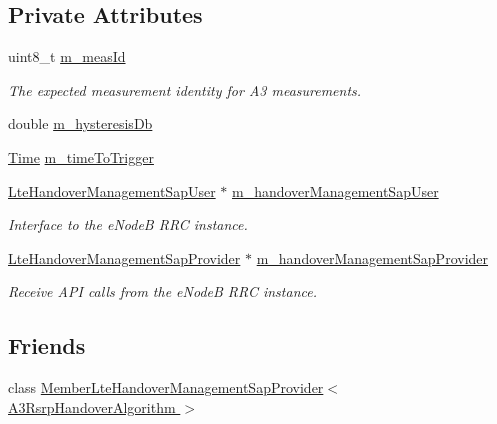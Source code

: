 \subsection*{Private Attributes}
\begin{DoxyCompactItemize}
\item 
uint8\+\_\+t \hyperlink{classns3_1_1A3RsrpHandoverAlgorithm_a96ba4646b316fc823618934a7a6d4aa1}{m\+\_\+meas\+Id}
\begin{DoxyCompactList}\small\item\em The expected measurement identity for A3 measurements. \end{DoxyCompactList}\item 
double \hyperlink{classns3_1_1A3RsrpHandoverAlgorithm_a2554a9c093c29f93f40efd6778d12a75}{m\+\_\+hysteresis\+Db}
\item 
\hyperlink{classns3_1_1Time}{Time} \hyperlink{classns3_1_1A3RsrpHandoverAlgorithm_a5158741f07ce566b8efc01f5e798ae78}{m\+\_\+time\+To\+Trigger}
\item 
\hyperlink{classns3_1_1LteHandoverManagementSapUser}{Lte\+Handover\+Management\+Sap\+User} $\ast$ \hyperlink{classns3_1_1A3RsrpHandoverAlgorithm_a2b06a54ee8a69e6943a4bd79bfe8da58}{m\+\_\+handover\+Management\+Sap\+User}
\begin{DoxyCompactList}\small\item\em Interface to the e\+NodeB R\+RC instance. \end{DoxyCompactList}\item 
\hyperlink{classns3_1_1LteHandoverManagementSapProvider}{Lte\+Handover\+Management\+Sap\+Provider} $\ast$ \hyperlink{classns3_1_1A3RsrpHandoverAlgorithm_a36db40273292062cc3e96236c32cbb2a}{m\+\_\+handover\+Management\+Sap\+Provider}
\begin{DoxyCompactList}\small\item\em Receive A\+PI calls from the e\+NodeB R\+RC instance. \end{DoxyCompactList}\end{DoxyCompactItemize}
\subsection*{Friends}
\begin{DoxyCompactItemize}
\item 
class \hyperlink{classns3_1_1A3RsrpHandoverAlgorithm_a6e30c965b87e5f343296131b96f7a27a}{Member\+Lte\+Handover\+Management\+Sap\+Provider$<$ A3\+Rsrp\+Handover\+Algorithm $>$}
\end{DoxyCompactItemize}
